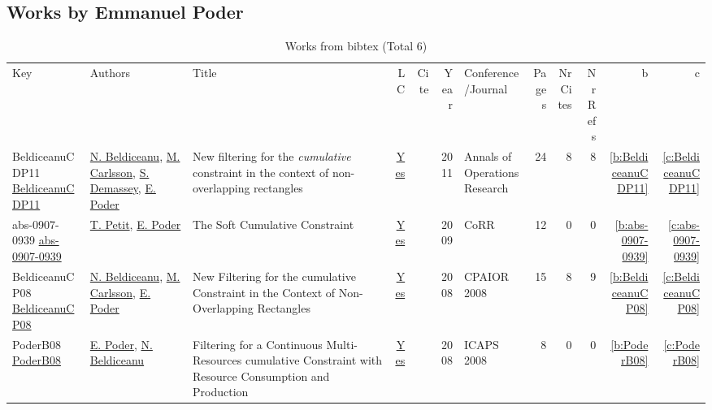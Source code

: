 \subsection{Works by Emmanuel Poder}
\label{sec:a364}
{\scriptsize
\begin{longtable}{>{\raggedright\arraybackslash}p{3cm}>{\raggedright\arraybackslash}p{6cm}>{\raggedright\arraybackslash}p{6.5cm}rrrp{2.5cm}rrrrr}
\rowcolor{white}\caption{Works from bibtex (Total 6)}\\ \toprule
\rowcolor{white}Key & Authors & Title & LC & Cite & Year & \shortstack{Conference\\/Journal} & Pages & \shortstack{Nr\\Cites} & \shortstack{Nr\\Refs} & b & c \\ \midrule\endhead
\bottomrule
\endfoot
BeldiceanuCDP11 \href{https://doi.org/10.1007/s10479-010-0731-0}{BeldiceanuCDP11} & \hyperref[auth:a129]{N. Beldiceanu}, \hyperref[auth:a91]{M. Carlsson}, \hyperref[auth:a246]{S. Demassey}, \hyperref[auth:a364]{E. Poder} & New filtering for the \emph{cumulative} constraint in the context of non-overlapping rectangles & \href{works/BeldiceanuCDP11.pdf}{Yes} & \cite{BeldiceanuCDP11} & 2011 & Annals of Operations Research & 24 & 8 & 8 & \ref{b:BeldiceanuCDP11} & \ref{c:BeldiceanuCDP11}\\
abs-0907-0939 \href{http://arxiv.org/abs/0907.0939}{abs-0907-0939} & \hyperref[auth:a227]{T. Petit}, \hyperref[auth:a364]{E. Poder} & The Soft Cumulative Constraint & \href{works/abs-0907-0939.pdf}{Yes} & \cite{abs-0907-0939} & 2009 & CoRR & 12 & 0 & 0 & \ref{b:abs-0907-0939} & \ref{c:abs-0907-0939}\\
BeldiceanuCP08 \href{https://doi.org/10.1007/978-3-540-68155-7\_5}{BeldiceanuCP08} & \hyperref[auth:a129]{N. Beldiceanu}, \hyperref[auth:a91]{M. Carlsson}, \hyperref[auth:a364]{E. Poder} & New Filtering for the cumulative Constraint in the Context of Non-Overlapping Rectangles & \href{works/BeldiceanuCP08.pdf}{Yes} & \cite{BeldiceanuCP08} & 2008 & CPAIOR 2008 & 15 & 8 & 9 & \ref{b:BeldiceanuCP08} & \ref{c:BeldiceanuCP08}\\
PoderB08 \href{http://www.aaai.org/Library/ICAPS/2008/icaps08-033.php}{PoderB08} & \hyperref[auth:a364]{E. Poder}, \hyperref[auth:a129]{N. Beldiceanu} & Filtering for a Continuous Multi-Resources cumulative Constraint with Resource Consumption and Production & \href{works/PoderB08.pdf}{Yes} & \cite{PoderB08} & 2008 & ICAPS 2008 & 8 & 0 & 0 & \ref{b:PoderB08} & \ref{c:PoderB08}\\

\end{longtable}}
